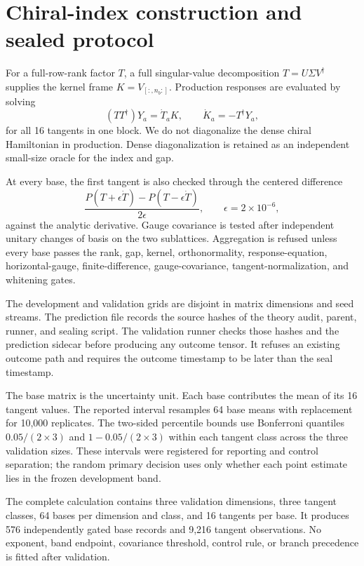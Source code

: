 \section{Chiral-index construction and sealed protocol}
\label{app:chiral-protocol}

For a full-row-rank factor $T$, a full singular-value decomposition $T=U\Sigma V^\dagger$ supplies the kernel frame $K=V_{[:,n_b:]}$.  Production responses are evaluated by solving
\begin{equation}
 (TT^\dagger)Y_a=\dot T_aK,
 \qquad \dot K_a=-T^\dagger Y_a,
\end{equation}
for all 16 tangents in one block.  We do not diagonalize the dense chiral Hamiltonian in production.  Dense diagonalization is retained as an independent small-size oracle for the index and gap.

At every base, the first tangent is also checked through the centered difference
\begin{equation}
 \frac{P(T+\epsilon\dot T)-P(T-\epsilon\dot T)}{2\epsilon},
 \qquad \epsilon=2\times10^{-6},
\end{equation}
against the analytic derivative.  Gauge covariance is tested after independent unitary changes of basis on the two sublattices.  Aggregation is refused unless every base passes the rank, gap, kernel, orthonormality, response-equation, horizontal-gauge, finite-difference, gauge-covariance, tangent-normalization, and whitening gates.

The development and validation grids are disjoint in matrix dimensions and seed streams.  The prediction file records the source hashes of the theory audit, parent, runner, and sealing script.  The validation runner checks those hashes and the prediction sidecar before producing any outcome tensor.  It refuses an existing outcome path and requires the outcome timestamp to be later than the seal timestamp.

The base matrix is the uncertainty unit.  Each base contributes the mean of its 16 tangent values.  The reported interval resamples 64 base means with replacement for 10,000 replicates.  The two-sided percentile bounds use Bonferroni quantiles $0.05/(2\times3)$ and $1-0.05/(2\times3)$ within each tangent class across the three validation sizes.  These intervals were registered for reporting and control separation; the random primary decision uses only whether each point estimate lies in the frozen development band.

The complete calculation contains three validation dimensions, three tangent classes, 64 bases per dimension and class, and 16 tangents per base.  It produces 576 independently gated base records and 9,216 tangent observations.  No exponent, band endpoint, covariance threshold, control rule, or branch precedence is fitted after validation.
